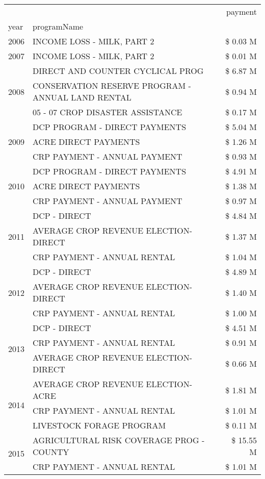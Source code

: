 \begin{tabular}{llr}
\toprule
 &  & payment \\
year & programName &  \\
\midrule
2006 & INCOME LOSS - MILK, PART 2 & \$ 0.03 M \\
\cline{1-3}
2007 & INCOME LOSS - MILK, PART 2 & \$ 0.01 M \\
\cline{1-3}
\multirow[t]{3}{*}{2008} & DIRECT AND COUNTER CYCLICAL PROG & \$ 6.87 M \\
 & CONSERVATION RESERVE PROGRAM - ANNUAL LAND RENTAL & \$ 0.94 M \\
 & 05 - 07 CROP DISASTER ASSISTANCE & \$ 0.17 M \\
\cline{1-3}
\multirow[t]{3}{*}{2009} & DCP PROGRAM - DIRECT PAYMENTS & \$ 5.04 M \\
 & ACRE DIRECT PAYMENTS & \$ 1.26 M \\
 & CRP PAYMENT - ANNUAL PAYMENT & \$ 0.93 M \\
\cline{1-3}
\multirow[t]{3}{*}{2010} & DCP PROGRAM - DIRECT PAYMENTS & \$ 4.91 M \\
 & ACRE DIRECT PAYMENTS & \$ 1.38 M \\
 & CRP PAYMENT - ANNUAL PAYMENT & \$ 0.97 M \\
\cline{1-3}
\multirow[t]{3}{*}{2011} & DCP - DIRECT & \$ 4.84 M \\
 & AVERAGE CROP REVENUE ELECTION-DIRECT & \$ 1.37 M \\
 & CRP PAYMENT - ANNUAL RENTAL & \$ 1.04 M \\
\cline{1-3}
\multirow[t]{3}{*}{2012} & DCP - DIRECT & \$ 4.89 M \\
 & AVERAGE CROP REVENUE ELECTION-DIRECT & \$ 1.40 M \\
 & CRP PAYMENT - ANNUAL RENTAL & \$ 1.00 M \\
\cline{1-3}
\multirow[t]{3}{*}{2013} & DCP - DIRECT & \$ 4.51 M \\
 & CRP PAYMENT - ANNUAL RENTAL & \$ 0.91 M \\
 & AVERAGE CROP REVENUE ELECTION-DIRECT & \$ 0.66 M \\
\cline{1-3}
\multirow[t]{3}{*}{2014} & AVERAGE CROP REVENUE ELECTION-ACRE & \$ 1.81 M \\
 & CRP PAYMENT - ANNUAL RENTAL & \$ 1.01 M \\
 & LIVESTOCK FORAGE PROGRAM & \$ 0.11 M \\
\cline{1-3}
\multirow[t]{3}{*}{2015} & AGRICULTURAL RISK COVERAGE PROG - COUNTY & \$ 15.55 M \\
 & CRP PAYMENT - ANNUAL RENTAL & \$ 1.01 M \\

\end{tabular}
